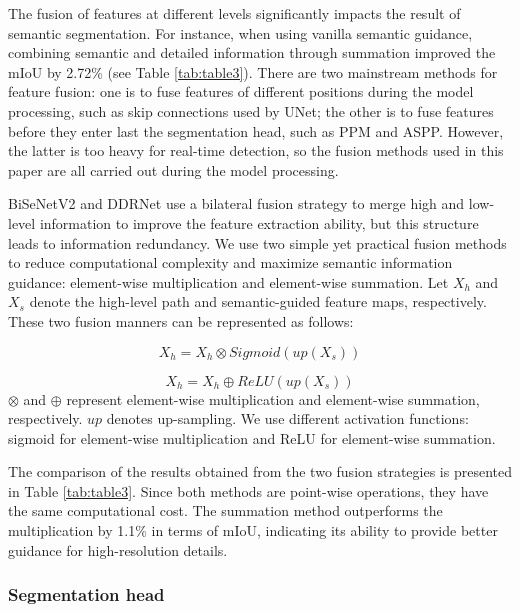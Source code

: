 \documentclass[preprint,12pt,authoryear]{elsarticle}
\begin{document}
The fusion of features at different levels significantly impacts the result of semantic segmentation. For instance, when using vanilla semantic guidance, combining semantic and detailed information through summation improved the mIoU by 2.72\% (see Table \ref{tab:table3}). There are two mainstream methods for feature fusion: one is to fuse features of different positions during the model processing, such as skip connections used by UNet; the other is to fuse features before they enter last the segmentation head, such as PPM and ASPP. However, the latter is too heavy for real-time detection, so the fusion methods used in this paper are all carried out during the model processing.


BiSeNetV2 and DDRNet use a bilateral fusion strategy to merge high and low-level information to improve the feature extraction ability, but this structure leads to information redundancy. We use two simple yet practical fusion methods to reduce computational complexity and maximize semantic information guidance: element-wise multiplication and element-wise summation. Let $X_h$ and $X_s$ denote the high-level path and semantic-guided feature maps, respectively. These two fusion manners can be represented as follows:

\begin{equation}
    X_h = X_h \otimes Sigmoid(up(X_s))
\end{equation}

\begin{equation}
   X_h=  X_h \oplus  ReLU(up(X_s))
\end{equation}
\noindent $\otimes$ and $\oplus$ represent element-wise multiplication and element-wise summation, respectively. $up$ denotes up-sampling. We use different activation functions: sigmoid for element-wise multiplication and ReLU for element-wise summation.

The comparison of the results obtained from the two fusion strategies is presented in Table \ref{tab:table3}. Since both methods are point-wise operations, they have the same computational cost. The summation method outperforms the multiplication by 1.1\% in terms of mIoU, indicating its ability to provide better guidance for high-resolution details.


\subsubsection{Segmentation head}
\label{subsubsec:segmentationhead}
\end{document}
